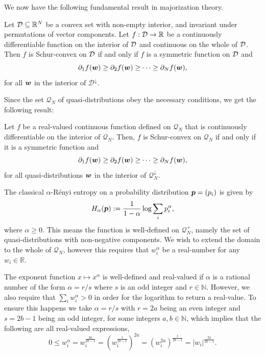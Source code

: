 \documentclass[pra,
aps,
twocolumn,
superscriptaddress,
groupedaddress,
nofootinbib,
reprint
]{revtex4-1}
\begin{document}
We now have the following fundamental result in majorization theory.
\begin{theorem} Let ${\mathcal D}\subseteq \mathbb{R}^N$ be a convex set with non-empty interior, and invariant under permutations of vector components. Let $f: {\mathcal D} \rightarrow \mathbb{R}$ be a continuously differentiable function on the interior of ${\mathcal D}$ and continuous on the whole of ${\mathcal D}$. Then $f$ is Schur-convex on ${\mathcal D}$ if and only if $f$ is a symmetric function on ${\mathcal D}$ and 
\begin{equation}
	\partial_1 f(\boldsymbol{w}) \ge \partial_2 f(\boldsymbol{w}) \ge \cdots \ge \partial_N f(\boldsymbol{w}),
\end{equation}
for all $\boldsymbol{w}$ in the interior of $\mathcal{D}^\downarrow$.
\end{theorem}
Since the set $\mathcal{Q}_N$ of quasi-distributions obey the necessary conditions, we get the following result:
\begin{lemma}
	Let $f$ be a real-valued continuous function defined on $\mathcal{Q}_N$ that is continuously differentiable on the interior of $\mathcal{Q}_N$. 
Then, $f$ is Schur-convex on $\mathcal{Q}_N$ if and only if it is a symmetric function and
\begin{equation}
	\partial_1 f(\boldsymbol{w}) \ge \partial_2 f(\boldsymbol{w}) \ge \cdots \ge \partial_N f(\boldsymbol{w}),
\end{equation}
for all quasi-distributions $\boldsymbol{w}$ in the interior of $\mathcal{Q}^\downarrow_N$.
\end{lemma}


The classical $\alpha$-R\'{e}nyi entropy on a probability distribution $\boldsymbol{p} = (p_i)$ is given by
\begin{equation}
	H_\alpha(\boldsymbol{p}) := \frac{1}{1-\alpha} \log \sum_i p_i^\alpha,
\end{equation}
where $\alpha \ge 0$. This means the function is well-defined on $\mathcal{Q}_N^+$, namely the set of quasi-distributions with non-negative components. We wish to extend the domain to the whole of $\mathcal{Q}_N$, however this requires that $w_i^\alpha$ be a real-number for any $w_i \in \mathbb{R}$. 

The exponent function $x \mapsto x^\alpha$ is well-defined and real-valued if $\alpha$ is a rational number of the form $\alpha = r / s$ where $s$ is an odd integer and $r \in \mathbb{N}$. However, we also require that $\sum_i w_i^\alpha > 0$ in order for the logarithm to return a real-value. To ensure this happens we take $\alpha = r/s$ with $r=2a$ being an even integer and $s=2b-1$ being an odd integer, for some integers $a,b\in  \mathbb{N}$, which implies that the following are all real-valued expressions,
\begin{equation}
0 \le w_i^\alpha = w_i^{\frac{2a}{2b-1}} = \left (w_i^{\frac{1}{2b-1}}\right )^{2a} =\left (w_i^{2a}\right )^{\frac{1}{2b-1}} = |w_i|^{\frac{2a}{2b-1}}.
\end{equation}
\end{document}
